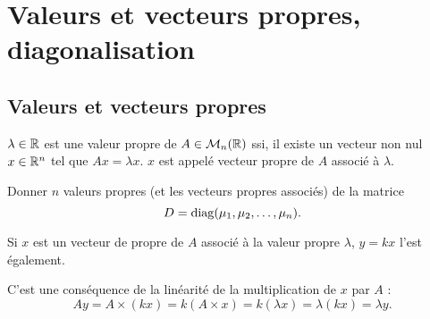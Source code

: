 \section{Valeurs et vecteurs propres, diagonalisation} \label{sec:LinAlg-Eigen}

\subsection{Valeurs et vecteurs propres} \label{sec:ValVecPropres}

\begin{definition*}
  $\lambda \in \mathbb{R}$ est une valeur propre de $A \in \mathcal{M}_n(\mathbb{R})$ ssi, il existe un vecteur non nul $x \in \mathbb{R}^n$ tel que $A x = \lambda x$. $x$ est appelé vecteur propre de $A$ associé à $\lambda$.
\end{definition*}

\begin{exercise*}
  Donner $n$ valeurs propres (et les vecteurs propres associés) de la matrice 
  $$
  D = \operatorname{diag}(\mu_1, \mu_2, \dots, \mu_n).
  $$
\end{exercise*}


\begin{proposition*}
  Si $x$ est un vecteur de propre de $A$ associé à la valeur propre $\lambda$, $y = k x$ l'est également.
\end{proposition*}

\proof 
  C'est une conséquence de la linéarité de la multiplication de $x$ par $A$ : 
  $$
  A y = A \times (k x) = k (A \times x) = k (\lambda x) = \lambda (k x) = \lambda y.
  $$
\eproof

